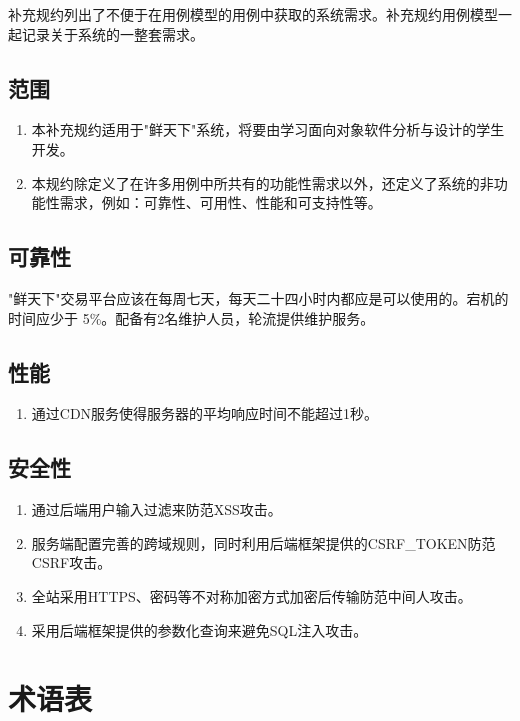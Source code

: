 
    补充规约列出了不便于在用例模型的用例中获取的系统需求。补充规约用例模型一起记录关于系统的一整套需求。


\subsection{范围}
    \begin{enumerate}

        \item 本补充规约适用于"鲜天下"系统，将要由学习面向对象软件分析与设计的学生开发。
        \item 本规约除定义了在许多用例中所共有的功能性需求以外，还定义了系统的非功能性需求，例如：可靠性、可用性、性能和可支持性等。

    \end{enumerate}

\subsection{可靠性}

    "鲜天下"交易平台应该在每周七天，每天二十四小时内都应是可以使用的。宕机的时间应少于 5\%。配备有2名维护人员，轮流提供维护服务。


\subsection{性能}
    \begin{enumerate}
        \item 通过CDN服务使得服务器的平均响应时间不能超过1秒。
    \end{enumerate}

\subsection{安全性}
    \begin{enumerate}
        \item 通过后端用户输入过滤来防范XSS攻击。
        \item 服务端配置完善的跨域规则，同时利用后端框架提供的CSRF\_TOKEN防范CSRF攻击。
        \item 全站采用HTTPS、密码等不对称加密方式加密后传输防范中间人攻击。
        \item 采用后端框架提供的参数化查询来避免SQL注入攻击。
    \end{enumerate}

\newpage
\section{术语表}

